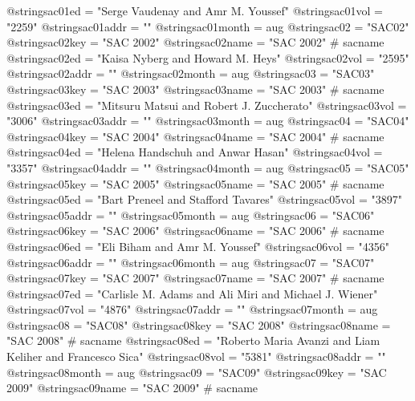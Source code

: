 @string{sac01ed =               "Serge Vaudenay and Amr M. Youssef"}
@string{sac01vol =              "2259"}
@string{sac01addr =             ""}
@string{sac01month =            aug}
@string{sac02 =                 "SAC02"}
@string{sac02key =              "SAC 2002"}
@string{sac02name =             "SAC 2002" # sacname}
@string{sac02ed =               "Kaisa Nyberg and Howard M. Heys"}
@string{sac02vol =              "2595"}
@string{sac02addr =             ""}
@string{sac02month =            aug}
@string{sac03 =                 "SAC03"}
@string{sac03key =              "SAC 2003"}
@string{sac03name =             "SAC 2003" # sacname}
@string{sac03ed =               "Mitsuru Matsui and Robert J. Zuccherato"}
@string{sac03vol =              "3006"}
@string{sac03addr =             ""}
@string{sac03month =            aug}
@string{sac04 =                 "SAC04"}
@string{sac04key =              "SAC 2004"}
@string{sac04name =             "SAC 2004" # sacname}
@string{sac04ed =               "Helena Handschuh and Anwar Hasan"}
@string{sac04vol =              "3357"}
@string{sac04addr =             ""}
@string{sac04month =            aug}
@string{sac05 =                 "SAC05"}
@string{sac05key =              "SAC 2005"}
@string{sac05name =             "SAC 2005" # sacname}
@string{sac05ed =               "Bart Preneel and Stafford Tavares"}
@string{sac05vol =              "3897"}
@string{sac05addr =             ""}
@string{sac05month =            aug}
@string{sac06 =                 "SAC06"}
@string{sac06key =              "SAC 2006"}
@string{sac06name =             "SAC 2006" # sacname}
@string{sac06ed =               "Eli Biham and Amr M. Youssef"}
@string{sac06vol =              "4356"}
@string{sac06addr =             ""}
@string{sac06month =            aug}
@string{sac07 =                 "SAC07"}
@string{sac07key =              "SAC 2007"}
@string{sac07name =             "SAC 2007" # sacname}
@string{sac07ed =               "Carlisle M. Adams and Ali Miri and Michael J. Wiener"}
@string{sac07vol =              "4876"}
@string{sac07addr =             ""}
@string{sac07month =            aug}
@string{sac08 =                 "SAC08"}
@string{sac08key =              "SAC 2008"}
@string{sac08name =             "SAC 2008" # sacname}
@string{sac08ed =               "Roberto Maria Avanzi and Liam Keliher and Francesco Sica"}
@string{sac08vol =              "5381"}
@string{sac08addr =             ""}
@string{sac08month =            aug}
@string{sac09 =                 "SAC09"}
@string{sac09key =              "SAC 2009"}
@string{sac09name =             "SAC 2009" # sacname}
